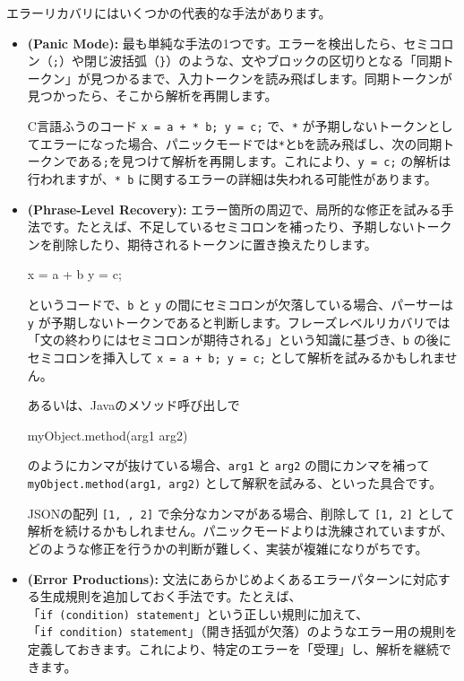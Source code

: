 エラーリカバリにはいくつかの代表的な手法があります。

\begin{itemize}
\item
  \textbf{\sffamily (Panic Mode):}
  最も単純な手法の1つです。エラーを検出したら、セミコロン（\texttt{;}）や閉じ波括弧（\texttt{\}}）のような、文やブロックの区切りとなる「同期トークン」が見つかるまで、入力トークンを読み飛ばします。同期トークンが見つかったら、そこから解析を再開します。

  C言語ふうのコード \texttt{x\ =\ a\ +\ *\ b;\ y\ =\ c;} で、\texttt{*}
  が予期しないトークンとしてエラーになった場合、パニックモードでは\texttt{*}と\texttt{b}を読み飛ばし、次の同期トークンである\texttt{;}を見つけて解析を再開します。これにより、\texttt{y\ =\ c;}
  の解析は行われますが、\texttt{* b}
  に関するエラーの詳細は失われる可能性があります。
\item
  \textbf{\sffamily (Phrase-Level Recovery):}
  エラー箇所の周辺で、局所的な修正を試みる手法です。たとえば、不足しているセミコロンを補ったり、予期しないトークンを削除したり、期待されるトークンに置き換えたりします。

\begin{codescreen}{}
x = a + b y = c;
\end{codescreen}

  というコードで、\texttt{b} と \texttt{y}
  の間にセミコロンが欠落している場合、パーサーは \texttt{y}
  が予期しないトークンであると判断します。フレーズレベルリカバリでは「文の終わりにはセミコロンが期待される」という知識に基づき、\texttt{b}
  の後にセミコロンを挿入して \texttt{x\ =\ a\ +\ b;\ y\ =\ c;}
  として解析を試みるかもしれません。

  あるいは、Javaのメソッド呼び出しで

\begin{codescreen}{}
myObject.method(arg1 arg2)
\end{codescreen}

のようにカンマが抜けている場合、\texttt{arg1} と \texttt{arg2}
の間にカンマを補って \texttt{myObject.method(arg1,\ arg2)}
として解釈を試みる、といった具合です。

JSONの配列 \texttt{{[}1,\ ,\ 2{]}} で余分なカンマがある場合、削除して
\texttt{{[}1,\ 2{]}}
として解析を続けるかもしれません。パニックモードよりは洗練されていますが、どのような修正を行うかの判断が難しく、実装が複雑になりがちです。

\item
  \textbf{\sffamily (Error Productions):}
  文法にあらかじめよくあるエラーパターンに対応する生成規則を追加しておく手法です。たとえば、「\texttt{if\ (condition)\ statement}」という正しい規則に加えて、「\texttt{if\ condition)\ statement}」（開き括弧が欠落）のようなエラー用の規則を定義しておきます。これにより、特定のエラーを「受理」し、解析を継続できます。


\end{itemize}
